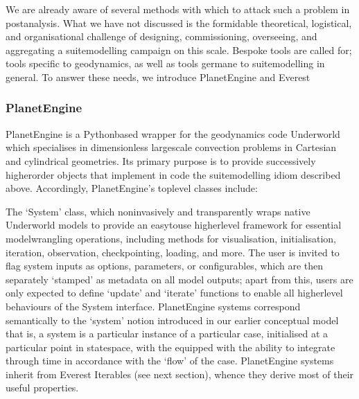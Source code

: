\documentclass[letterpaper,10pt,english]{jupyterBook}
\begin{document}
\sphinxAtStartPar
We are already aware of several methods with which to attack such a problem in post\sphinxhyphen{}analysis. What we have not discussed is the formidable theoretical, logistical, and organisational challenge of designing, commissioning, overseeing, and aggregating a suite\sphinxhyphen{}modelling campaign on this scale. Bespoke tools are called for; tools specific to geodynamics, as well as tools germane to suite\sphinxhyphen{}modelling in general. To answer these needs, we introduce PlanetEngine and Everest


\subsubsection{PlanetEngine}
\label{\detokenize{content/chapter_02_methods/section3:planetengine}}
\sphinxAtStartPar
PlanetEngine is a Python\sphinxhyphen{}based wrapper for the geodynamics code Underworld which specialises in dimensionless large\sphinxhyphen{}scale convection problems in Cartesian and cylindrical geometries. Its primary purpose is to provide successively higher\sphinxhyphen{}order objects that implement in code the suite\sphinxhyphen{}modelling idiom described above. Accordingly, PlanetEngine’s top\sphinxhyphen{}level classes include:

\sphinxAtStartPar
The ‘System’ class, which non\sphinxhyphen{}invasively and transparently wraps native Underworld models to provide an easy\sphinxhyphen{}to\sphinxhyphen{}use higher\sphinxhyphen{}level framework for essential model\sphinxhyphen{}wrangling operations, including methods for visualisation, initialisation, iteration, observation, checkpointing, loading, and more. The user is invited to flag system inputs as options, parameters, or configurables, which are then separately ‘stamped’ as metadata on all model outputs; apart from this, users are only expected to define ‘update’ and ‘iterate’ functions to enable all higher\sphinxhyphen{}level behaviours of the System interface. PlanetEngine systems correspond semantically to the ‘system’ notion introduced in our earlier conceptual model \sphinxhyphen{} that is, a system is a particular instance of a particular case, initialised at a particular point in state\sphinxhyphen{}space, with the equipped with the ability to integrate through time in accordance with the ‘flow’ of the case. PlanetEngine systems inherit from Everest Iterables (see next section), whence they derive most of their useful properties.
\end{document}
